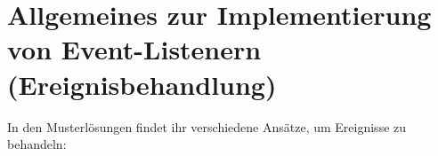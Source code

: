 \clearpage

\rehead[]{\textcolor{lightblue}{AvHG, Inf, My}}
\lohead[]{\textcolor{lightblue}{AvHG, Inf, My}}

\lstset{style=myJava}

\section[Allgemeines zur Implementierung von Event-Listenern
(Ereignisbehandlung) \tagZusatz \tagLK]{Allgemeines zur Implementierung von Event-Listenern\\
(Ereignisbehandlung) \tagZusatz \tagLK}

In den Musterlösungen findet ihr verschiedene Ansätze, um Ereignisse zu
behandeln:

